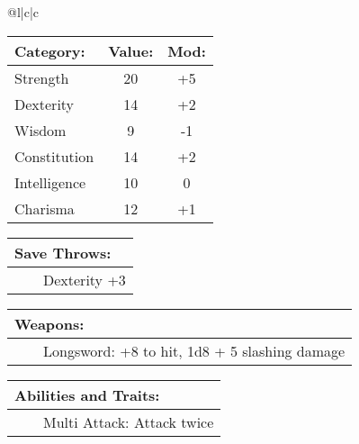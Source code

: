 \documentclass[11pt]{article}
\newcommand{\tabitem}{~~\llap{--}~~}
\begin{document}
\begin{multicols}{2}
\noindent \begin{tabularx}{\linewidth}{@{}l|c|c}
 \\
\hline
		\end{tabularx}
\noindent \begin{tabular}{@{}l|c|c}
\textbf{Category:} 			& \textbf{Value:} 	& \textbf{Mod:} \\
\hline
Strength 					& 20 				& +5		\\
Dexterity 					& 14 				& +2		\\
Wisdom 						& 9					& -1		\\
Constitution 				& 14 				& +2		\\
Intelligence 				& 10 				& 0			\\
Charisma 					& 12	 			& +1
		\end{tabular}

\vspace{4mm}

\noindent \begin{tabularx}{\linewidth}{@{}l}
{\Large \textbf{Save Throws:}} \\
\hline
\tabitem Dexterity +3
		\end{tabularx}

\vspace{4mm}

\noindent \begin{tabularx}{\linewidth}{@{}l}
{\Large \textbf{Weapons:}} \\
\hline
\tabitem Longsword: +8 to hit, 1d8 + 5 slashing damage
		\end{tabularx}

\vspace{4mm}

\noindent \begin{tabularx}{\linewidth}{@{}l}
{\Large \textbf{Abilities and Traits:}} \\
\hline
\tabitem Multi Attack: Attack twice
		\end{tabularx}
	\end{multicols}
\end{document}
